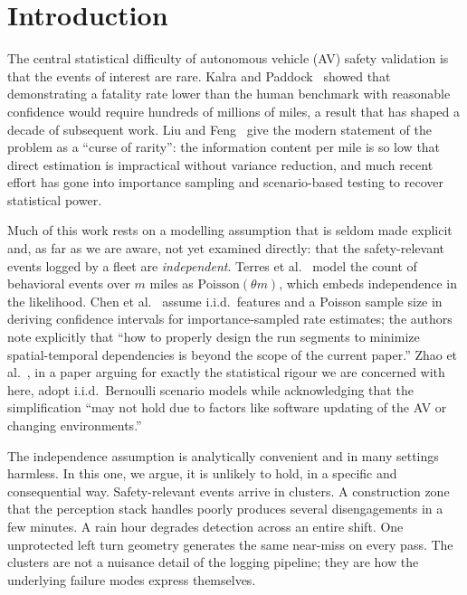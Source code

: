 \documentclass[11pt]{article}
\begin{document}
\section{Introduction}

The central statistical difficulty of autonomous vehicle (AV) safety validation is
that the events of interest are rare. Kalra and Paddock~\cite{kalra2016driving}
showed that demonstrating a fatality rate lower than the human benchmark with
reasonable confidence would require hundreds of millions of miles, a result that
has shaped a decade of subsequent work. Liu and Feng~\cite{liu2024curse} give the
modern statement of the problem as a ``curse of rarity'': the information content
per mile is so low that direct estimation is impractical without variance
reduction, and much recent effort has gone into importance sampling and
scenario-based testing to recover statistical power.

Much of this work rests on a modelling assumption that is seldom made explicit
and, as far as we are aware, not yet examined directly: that the safety-relevant
events logged by a fleet are \emph{independent}. Terres et al.~\cite{terres2023behavioral} model the count
of behavioral events over $m$ miles as $\mathrm{Poisson}(\theta m)$, which embeds
independence in the likelihood. Chen et al.~\cite{chen2026confidence} assume
i.i.d.\ features and a Poisson sample size in deriving confidence intervals for
importance-sampled rate estimates; the authors note explicitly that ``how to
properly design the run segments to minimize spatial-temporal dependencies is
beyond the scope of the current paper.'' Zhao et al.~\cite{zhao2025need}, in a
paper arguing for exactly the statistical rigour we are concerned with here,
adopt i.i.d.\ Bernoulli scenario models while acknowledging that the simplification
``may not hold due to factors like software updating of the AV or changing
environments.''

The independence assumption is analytically convenient and in many settings
harmless. In this one, we argue, it is unlikely to hold, in a specific and
consequential way. Safety-relevant events arrive in clusters. A
construction zone that the perception stack handles poorly produces several
disengagements in a few minutes. A rain hour degrades detection across an entire
shift. One unprotected left turn geometry generates the same near-miss on every
pass. The clusters are not a nuisance detail of the logging pipeline; they are how
the underlying failure modes express themselves.
\end{document}
